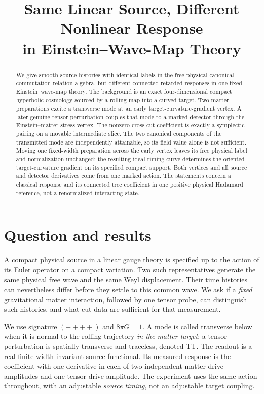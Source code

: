 \documentclass[11pt]{article}
\title{Same Linear Source, Different Nonlinear Response\\in Einstein--Wave-Map Theory}
\author{}
\date{}
\numberwithin{equation}{section}
\begin{document}
\maketitle

\begin{abstract}
We give smooth source histories with identical labels in the free physical canonical commutation relation algebra, but different connected retarded responses in one fixed Einstein--wave-map theory. The background is an exact four-dimensional compact hyperbolic cosmology sourced by a rolling map into a curved target. Two matter preparations excite a transverse mode at an early target-curvature-gradient vertex. A later genuine tensor perturbation couples that mode to a marked detector through the Einstein--matter stress vertex. The nonzero cross-cut coefficient is exactly a symplectic pairing on a movable intermediate slice. The two canonical components of the transmitted mode are independently attainable, so its field value alone is not sufficient. Moving one fixed-width preparation across the early vertex leaves its free physical label and normalization unchanged; the resulting ideal timing curve determines the oriented target-curvature gradient on its specified compact support. Both vertices and all source and detector derivatives come from one marked action. The statements concern a classical response and its connected tree coefficient in one positive physical Hadamard reference, not a renormalized interacting state.
\end{abstract}

\section{Question and results}

A compact physical source in a linear gauge theory is specified up to the action of its Euler operator on a compact variation. Two such representatives generate the same physical free wave and the same Weyl displacement. Their time histories can nevertheless differ before they settle to this common wave. We ask if a \emph{fixed} gravitational matter interaction, followed by one tensor probe, can distinguish such histories, and what cut data are sufficient for that measurement.

We use signature $(-+++)$ and $8\pi G=1$. A mode is called transverse below when it is normal to the rolling trajectory \emph{in the matter target}; a tensor perturbation is spatially transverse and traceless, denoted TT. The readout is a real finite-width invariant source functional. Its measured response is the coefficient with one derivative in each of two independent matter drive amplitudes and one tensor drive amplitude. The experiment uses the same action throughout, with an adjustable \emph{source timing}, not an adjustable target coupling.
\end{document}
